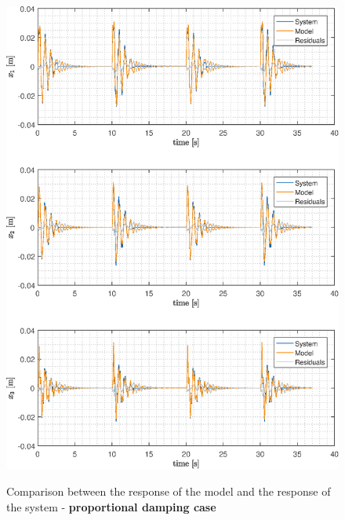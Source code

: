 \documentclass[twosided,a4paper]{article}           %
\begin{document}
\begin{figure}[H]
	\centering
	\caption{Comparison between the response of the model and the response of the system - \textbf{proportional damping case}}
	\includegraphics[width=\linewidth]{img/compare_p}
	\label{fig:compare_p}
\end{figure}
\end{document}

